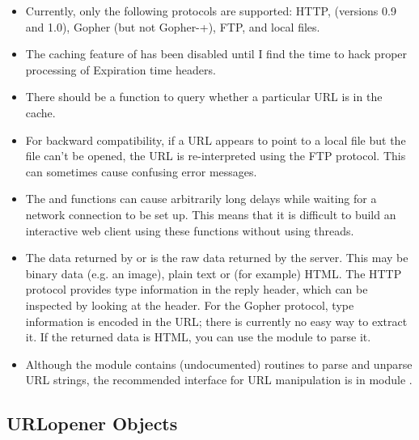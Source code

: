 \begin{itemize}

\item
Currently, only the following protocols are supported: HTTP, (versions
0.9 and 1.0), Gopher (but not Gopher-+), FTP, and local files.

\item
The caching feature of  has been disabled
until I find the time to hack proper processing of Expiration time
headers.

\item
There should be a function to query whether a particular URL is in
the cache.

\item
For backward compatibility, if a URL appears to point to a local file
but the file can't be opened, the URL is re-interpreted using the FTP
protocol.  This can sometimes cause confusing error messages.

\item
The  and  functions can
cause arbitrarily long delays while waiting for a network connection
to be set up.  This means that it is difficult to build an interactive
web client using these functions without using threads.

\item
The data returned by  or 
is the raw data returned by the server.  This may be binary data
(e.g. an image), plain text or (for example) HTML.  The
HTTP protocol provides type information in the
reply header, which can be inspected by looking at the
 header.  For the Gopher
protocol, type information is encoded in the URL; there is currently
no easy way to extract it.  If the returned data is HTML, you can use
the module  to parse it.

\item
Although the  module contains (undocumented) routines
to parse and unparse URL strings, the recommended interface for URL
manipulation is in module .

\end{itemize}


\subsection{URLopener Objects \label{urlopener-objs}}

